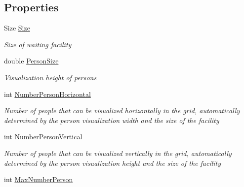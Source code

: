 \subsection*{Properties}
\begin{DoxyCompactItemize}
\item 
Size \hyperlink{class_simulation_w_p_f_visualization_tools_1_1_health_care_objects_1_1_draw_dynamic_holding_entity_a0090bc66182a727ad5a89b2775e91cf5}{Size}
\begin{DoxyCompactList}\small\item\em Size of waiting facility \end{DoxyCompactList}\item 
double \hyperlink{class_simulation_w_p_f_visualization_tools_1_1_health_care_objects_1_1_draw_dynamic_holding_entity_a398ebc529efea3f47c8a263c301d3836}{Person\+Size}
\begin{DoxyCompactList}\small\item\em Visualization height of persons \end{DoxyCompactList}\item 
int \hyperlink{class_simulation_w_p_f_visualization_tools_1_1_health_care_objects_1_1_draw_dynamic_holding_entity_af063da806201586f9075b6ac59cf0cf5}{Number\+Person\+Horizontal}
\begin{DoxyCompactList}\small\item\em Number of people that can be visualized horizontally in the grid, automatically determined by the person visualization width and the size of the facility \end{DoxyCompactList}\item 
int \hyperlink{class_simulation_w_p_f_visualization_tools_1_1_health_care_objects_1_1_draw_dynamic_holding_entity_adb083146ee3a520a2d1bbd19520e3b7a}{Number\+Person\+Vertical}
\begin{DoxyCompactList}\small\item\em Number of people that can be visualized vertically in the grid, automatically determined by the person visualization height and the size of the facility \end{DoxyCompactList}\item 
int \hyperlink{class_simulation_w_p_f_visualization_tools_1_1_health_care_objects_1_1_draw_dynamic_holding_entity_ae02a320e356b0916fbdd4d1b100741af}{Max\+Number\+Person}

\end{DoxyCompactItemize}
